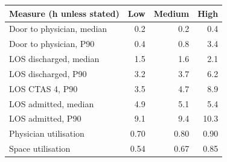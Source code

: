 \begin{tabular}{lrrr}
\toprule
Measure (h unless stated) & Low & Medium & High \\
\midrule
Door to physician, median & 0.2 & 0.2 & 0.4 \\
Door to physician, P90 & 0.4 & 0.8 & 3.4 \\
LOS discharged, median & 1.5 & 1.6 & 2.1 \\
LOS discharged, P90 & 3.2 & 3.7 & 6.2 \\
LOS CTAS 4, P90 & 3.5 & 4.7 & 8.9 \\
LOS admitted, median & 4.9 & 5.1 & 5.4 \\
LOS admitted, P90 & 9.1 & 9.4 & 10.3 \\
Physician utilisation & 0.70 & 0.80 & 0.90 \\
Space utilisation & 0.54 & 0.67 & 0.85 \\
\bottomrule
\end{tabular}